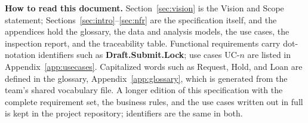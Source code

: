 \noindent\textbf{How to read this document.} Section~\ref{sec:vision} is the Vision and Scope statement; Sections~\ref{sec:intro}--\ref{sec:nfr} are the specification itself, and the appendices hold the glossary, the data and analysis models, the use cases, the inspection report, and the traceability table. Functional requirements carry dot-notation identifiers such as \textbf{Draft.Submit.Lock}; use cases UC-$n$ are listed in Appendix~\ref{app:usecases}. Capitalized words such as Request, Hold, and Loan are defined in the glossary, Appendix~\ref{app:glossary}, which is generated from the team's shared vocabulary file. A longer edition of this specification with the complete requirement set, the business rules, and the use cases written out in full is kept in the project repository; identifiers are the same in both.

\tableofcontents
\clearpage
